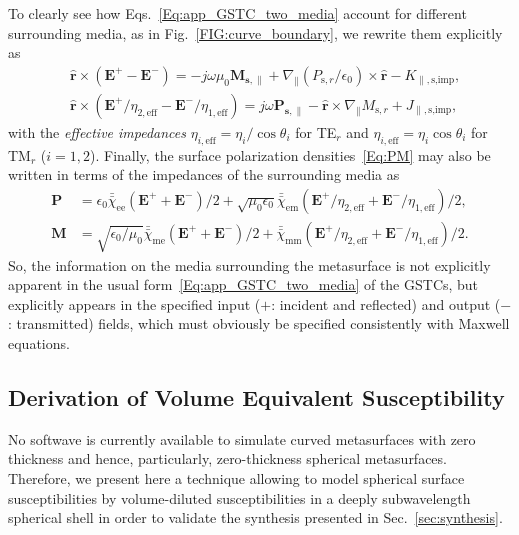 \documentclass[journal,transaction]{IEEEtran}
\newcommand{\figref}{Fig.~\ref}
\newcommand{\ve}[1]{\mathbf{#1}}
\newcommand{\uve}[1]{\mathbf{\hat{#1}}}
\begin{document}
To clearly see how Eqs.~\eqref{Eq:app_GSTC_two_media} account for different surrounding media, as in \figref{FIG:curve_boundary}, we rewrite them explicitly as
%
\begin{subequations}\label{Eq:app_two_media}
\begin{align}
&\uve{r}\times(\ve{E}^+-\ve{E}^-)=-j\omega\mu_0\ve{M_{\text{s},\|}}+\nabla_{\|}(P_{\text{s},r}/\epsilon_0)\times\uve{r}-K_{\|,\text{s,imp}},\\
&\uve{r}\times(\ve{E}^+/\eta_{2,\text{eff}}-\ve{E}^-/\eta_{1,\text{eff}})=j\omega\ve{P_{\text{s},\|}}-\uve{r}\times\nabla_{\|}M_{\text{s},r}+J_{\|,\text{s,imp}},
\end{align}
\end{subequations}
%
with the \emph{effective impedances} $\eta_{i,\text{eff}}=\eta_i/\cos\theta_i$ for TE$_r$ and $\eta_{i,\text{eff}}=\eta_i\cos\theta_i$ for TM$_r$ ($i=1,2$). Finally, the surface polarization densities~\eqref{Eq:PM} may also be written in terms of the impedances of the surrounding media as
%
\begin{subequations}\label{Eq:PM_media}
\begin{align}
 \ve{P}&=\epsilon_0\bar{\bar{\chi}}_\text{ee}(\ve{E}^++\ve{E}^-)/2+\sqrt{\mu_0\epsilon_0}\bar{\bar{\chi}}_\text{em}(\ve{E}^+/\eta_{2,\text{eff}}+\ve{E}^-/\eta_{1,\text{eff}})/2,\\
 \ve{M}&=\sqrt{\epsilon_0/\mu_0}\bar{\bar{\chi}}_\text{me}(\ve{E}^++\ve{E}^-)/2+\bar{\bar{\chi}}_\text{mm}(\ve{E}^+/\eta_{2,\text{eff}}+\ve{E}^-/\eta_{1,\text{eff}})/2.
\end{align}
\end{subequations}
%
So, the information on the media surrounding the metasurface is not explicitly apparent in the usual form~\eqref{Eq:app_GSTC_two_media} of the GSTCs, but explicitly appears in the specified input ($+$: incident and reflected) and output ($-$: transmitted) fields, which must obviously be specified consistently with Maxwell equations.

\subsection{Derivation of Volume Equivalent Susceptibility}\label{sec:sur_vol_chi}

No softwave is currently available to simulate curved metasurfaces with zero thickness and hence, particularly, zero-thickness spherical metasurfaces. Therefore, we present here a technique allowing to model spherical surface susceptibilities by volume-diluted susceptibilities in a deeply subwavelength spherical shell in order to validate the synthesis presented in Sec.~\ref{sec:synthesis}.
\end{document}
